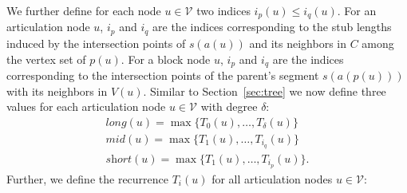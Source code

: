 \documentclass[a4paper,english,numberwithinsect]{eurocg18}
\newcommand{\sollong}{\ensuremath{\textit{long}}\xspace}
\newcommand{\solmid}{\ensuremath{\textit{mid}}\xspace}
\newcommand{\solshort}{\ensuremath{\textit{short}}\xspace}
\begin{document}
We further define for each node $ u \in \mathcal V $ two indices $ i_p(u) \le i_q(u) $. %
For an articulation node $u$, $i_p$ and $i_q$ are the indices corresponding to the stub lengths induced by the intersection points of $s(a(u))$ and its neighbors in $C$ among the vertex set of $p(u)$.
For a block node $u$, $i_p$ and $i_q$ are the indices corresponding to the intersection points of the parent's segment $s(a(p(u)))$ with its neighbors in $V(u)$.
Similar to Section~\ref{sec:tree} we now define three values for each articulation node $ u \in \mathcal V $ with degree $ \delta $:
\begin{align*}
	\sollong(u) = \max\{T_0(u),\dots,T_\delta(u)\}\\
	\solmid(u) = \max\{T_1(u),\dots,T_{i_q}(u)\}\\
	\solshort(u) = \max\{T_1(u),\dots,T_{i_p}(u)\}.
\end{align*}
Further, we define the recurrence $T_i(u)$ for all articulation nodes $u \in \mathcal V$:
\end{document}
